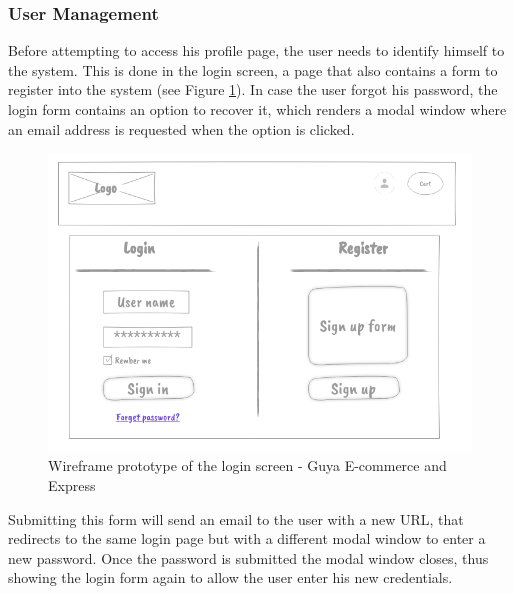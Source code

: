 \subsubsection{User Management}
Before attempting to access his profile page, the user needs to identify himself to the system. This is done in the login screen, a page that also contains a form to register into the system (see Figure \ref{login-page}). In case the user forgot his password, the login form contains an option to recover it, which renders a modal window where an email address is requested when the option is clicked.

\begin{figure}[!h]
\center
\includegraphics[keepaspectratio, width=15cm]{wireframes/loginpage.png}
\caption{Wireframe prototype of the login screen - Guya E-commerce and Express}
\label{login-page}
\end{figure}
\clearpage

Submitting this form will send an email to the user with a new URL, that redirects to the same login page but with a different modal window to enter a new password. Once the password is submitted the modal window closes, thus showing the login form again to allow the user enter his new credentials.

